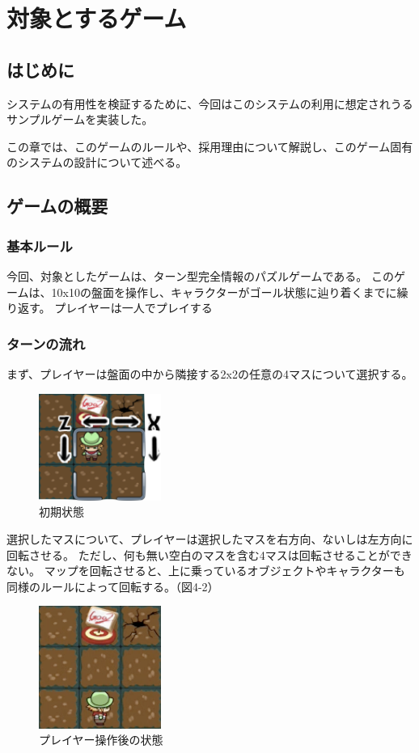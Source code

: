 \chapter{対象とするゲーム}
\section{はじめに} 
システムの有用性を検証するために、今回はこのシステムの利用に想定されうるサンプルゲームを実装した。

この章では、このゲームのルールや、採用理由について解説し、このゲーム固有のシステムの設計について述べる。

\section{ゲームの概要} 
\subsection{基本ルール} 
今回、対象としたゲームは、ターン型完全情報のパズルゲームである。
このゲームは、10x10の盤面を操作し、キャラクターがゴール状態に辿り着くまでに繰り返す。
プレイヤーは一人でプレイする
\subsection{ターンの流れ}
まず、プレイヤーは盤面の中から隣接する2x2の任意の4マスについて選択する。

\begin{figure}[htbp]
  \begin{center}
    \includegraphics[bb=0 0 172 150, width=4cm]{images/41.png}
  \end{center}
  \caption{初期状態}
  \label{fig:one}
\end{figure}

選択したマスについて、プレイヤーは選択したマスを右方向、ないしは左方向に回転させる。
ただし、何も無い空白のマスを含む4マスは回転させることができない。
マップを回転させると、上に乗っているオブジェクトやキャラクターも同様のルールによって回転する。（図4-2）

\begin{figure}[htbp]
  \begin{center}
    \includegraphics[bb=0 0 172 150, width=4cm]{images/42.png}
  \end{center}
  \caption{プレイヤー操作後の状態}
  \label{fig:one}
\end{figure}

